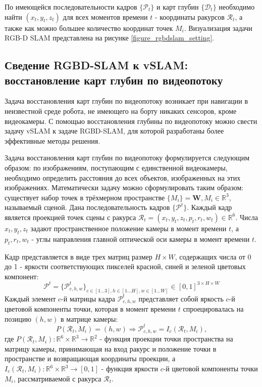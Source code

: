 \documentclass{mipt-thesis-ms}
\begin{document}
	По имеющейся последовательности кадров $\{\mathcal{P}_t\}$ и карт глубин $\{\mathcal{D}_t\}$ необходимо найти $(x_t, y_t, z_t)$ для всех моментов времени $t$ - координаты ракурсов $\mathcal{R}_t$, а также как можно большее количество координат точек $M_i$. Визуализация задачи RGB-D SLAM представлена на рисунке \ref{figure_rgbdslam_setting}.
	
	\subsection{Сведение RGBD-SLAM к vSLAM: восстановление карт глубин по видеопотоку}
	
	Задача восстановления карт глубин по видеопотоку возникает при навигации в неизвестной среде робота, не имеющего на борту никаких сенсоров, кроме видеокамеры. С помощью восстановления глубины по видеопотоку можно свести задачу vSLAM к задаче RGBD-SLAM, для которой разработаны более эффективные методы решения.
	
	Задача восстановления карт глубин по видеопотоку формулируется следующим образом: по изображениям, поступающим с единственной видеокамеры, необходимо определить расстояния до всех объектов, изображенных на этих изображениях. Математически задачу можно сформулировать таким образом: существует набор точек в трёхмерном пространстве $\{M_i \} = \textbf{W}, M_i \in \mathbb{R}^3$, называемый сценой. Дана последовательность кадров $\{\mathcal{P}^t\}$. Каждый кадр является проекцией точек сцены с ракурса $\mathcal{R}_t = (x_t, y_t, z_t, p_t, r_t, w_t) \in \mathbb{R}^6$. Числа $x_t, y_t, z_t$ задают пространственное положение камеры в момент времени $t$, а $p_t, r_t, w_t$ - углы направления главной оптической оси камеры в момент времени $t$.
	
	Кадр представляется в виде трех матриц размер $H \times W$, содержащих числа от 0 до 1 - яркости соответствующих пикселей красной, синей и зеленой цветовых компонент:
	$$\mathcal{P}^t = \{\mathcal{P}^t_{c,h,w}\}_{c \in [1 \dots 3], h \in [1 \dots H], w \in [1 \dots W]} \in [0, 1]^{3 \times H \times W}$$
	Каждый элемент $c$-й матрицы кадра $\mathcal{P}^t_{c,h,w}$ представляет собой яркость $c$-й цветовой компоненты точки, которая в момент времени $t$ спроецировалась на позицию $(h, w)$ в матрице камеры:
	$$P(\mathcal{R}_t, M_i) = (h, w) \Rightarrow \mathcal{P}^t_{c,h,w} = I_c(\mathcal{R}_t, M_i),$$
	где $P(\mathcal{R}_t, M_i): \mathbb{R}^6 \times \mathbb{R}^3 \rightarrow \mathbb{R}^2$ - функция проекции точки пространства на матрицу камеры, принимающая на вход ракурс и положение точки в пространстве и возвращающая координаты проекции, а $I_c (\mathcal{R}_t, M_i): \mathbb{R}^6 \times \mathbb{R}^3 \rightarrow [0, 1]$ - функция яркости $c$-й цветовой компоненты точки $M_i$, рассматриваемой с ракурса $\mathcal{R}_t$.
	
\end{document}
